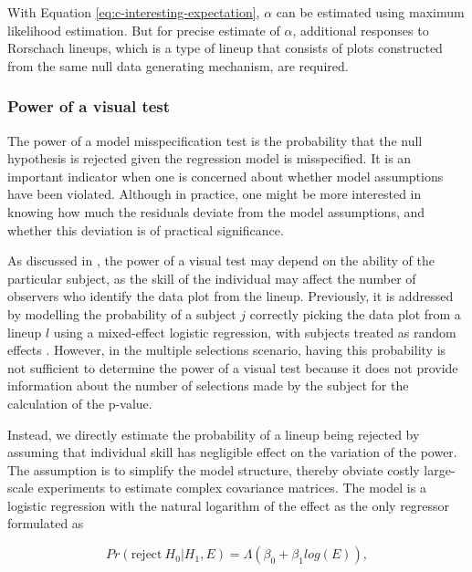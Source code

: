 \documentclass[]{interact}
\theoremstyle{plain}%
\theoremstyle{definition}
\theoremstyle{remark}
\begin{document}
With Equation \ref{eq:c-interesting-expectation}, \(\alpha\) can be
estimated using maximum likelihood estimation. But for precise estimate
of \(\alpha\), additional responses to Rorschach lineups, which is a
type of lineup that consists of plots constructed from the same null
data generating mechanism, are required.

\hypertarget{power-of-a-visual-test}{%
\subsubsection{Power of a visual test}\label{power-of-a-visual-test}}

The power of a model misspecification test is the probability that the
null hypothesis is rejected given the regression model is misspecified.
It is an important indicator when one is concerned about whether model
assumptions have been violated. Although in practice, one might be more
interested in knowing how much the residuals deviate from the model
assumptions, and whether this deviation is of practical significance.

As discussed in \citet{majumder_validation_2013}, the power of a visual
test may depend on the ability of the particular subject, as the skill
of the individual may affect the number of observers who identify the
data plot from the lineup. Previously, it is addressed by modelling the
probability of a subject \(j\) correctly picking the data plot from a
lineup \(l\) using a mixed-effect logistic regression, with subjects
treated as random effects \citep{majumder_validation_2013}. However, in
the multiple selections scenario, having this probability is not
sufficient to determine the power of a visual test because it does not
provide information about the number of selections made by the subject
for the calculation of the p-value.

Instead, we directly estimate the probability of a lineup being rejected
by assuming that individual skill has negligible effect on the variation
of the power. The assumption is to simplify the model structure, thereby
obviate costly large-scale experiments to estimate complex covariance
matrices. The model is a logistic regression with the natural logarithm
of the effect as the only regressor formulated as

\begin{equation} \label{eq:logistic-regression-1-1}
Pr(\text{reject}~H_0|H_1,E) = \Lambda(\beta_0 + \beta_1 log(E)),
\end{equation}
\end{document}
